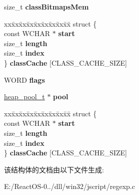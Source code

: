 \begin{DoxyCompactItemize}
\item 
\mbox{\label{struct_compiler_state_a3d67f42b72c5ed747fa02a8a57079970}} 
size\+\_\+t {\bfseries class\+Bitmaps\+Mem}
\item 
\mbox{\label{struct_compiler_state_a917d41574ed5d077fcbca22beebfe536}} 
\begin{tabbing}
xx\=xx\=xx\=xx\=xx\=xx\=xx\=xx\=xx\=\kill
struct \{\\
\>const WCHAR $\ast$ {\bfseries start}\\
\>size\_t {\bfseries length}\\
\>size\_t {\bfseries index}\\
\} {\bfseries classCache} \mbox{[}CLASS\_CACHE\_SIZE\mbox{]}\\

\end{tabbing}\item 
\mbox{\label{struct_compiler_state_ada52503b5935496ccd6abe863a2dac3b}} 
W\+O\+RD {\bfseries flags}
\item 
\mbox{\label{struct_compiler_state_a5780d847749d576f280b9c75eb7a33b1}} 
\hyperlink{structheap__pool__t}{heap\+\_\+pool\+\_\+t} $\ast$ {\bfseries pool}
\item 
\mbox{\label{struct_compiler_state_aeb8cff7d43dc1347b1b991c3fcc63d92}} 
\begin{tabbing}
xx\=xx\=xx\=xx\=xx\=xx\=xx\=xx\=xx\=\kill
struct \{\\
\>const WCHAR $\ast$ {\bfseries start}\\
\>size\_t {\bfseries length}\\
\>size\_t {\bfseries index}\\
\} {\bfseries classCache} \mbox{[}CLASS\_CACHE\_SIZE\mbox{]}\\

\end{tabbing}\end{DoxyCompactItemize}


该结构体的文档由以下文件生成\+:\begin{DoxyCompactItemize}
\item 
E\+:/\+React\+O\+S-\/0../dll/win32/jscript/regexp.\+c\end{DoxyCompactItemize}
